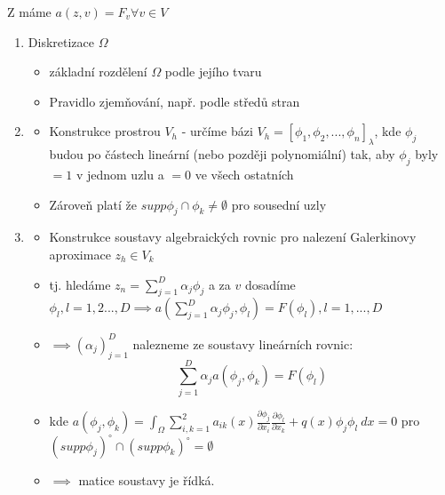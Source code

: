 \documentclass[../main.tex]{subfiles}
\begin{document}
Z  máme $a(z,v) = F_v \forall v \in V$ 


\begin{enumerate}
    \item Diskretizace $\Omega$ 
    \begin{itemize}
        \item základní rozdělení $\Omega$ podle jejího tvaru
        \item Pravidlo zjemňování, např. podle středů stran
    \end{itemize}

    \item\begin{itemize}
        \item Konstrukce prostrou $V_h$ - určíme bázi $V_h =  [\phi_1, \phi_2, ... , \phi_n ]_\lambda$, kde $\phi_j$ budou po částech lineární (nebo později polynomiální) tak, aby $\phi_j$ byly $=1$ v jednom uzlu a $=0$ ve všech ostatních
        \item Zároveň platí že $supp \phi_j \cap \phi_k \neq \emptyset$ pro sousední uzly
    \end{itemize}

    \item\begin{itemize}
        \item Konstrukce soustavy algebraických rovnic pro nalezení Galerkinovy aproximace $z_h \in V_k$
        \item tj. hledáme $z_n = \sum_{j=1}^D \alpha_j \phi_j$ a za $v$ dosadíme $\phi_l, l=1,2...,D \implies a(\sum_{j=1}^D \alpha_j \phi_j, \phi_l) = F(\phi_l), l = 1,...,D$
        \item $\implies (\alpha_j)^D_{j=1}$ nalezneme ze soustavy lineárních rovnic:
            \begin{equation}\label{soustavarovnic}
                \sum_{j=1}^D \alpha_j a(\phi_j, \phi_k) = F(\phi_l)
            \end{equation}
        \item kde $ a(\phi_j, \phi_k) = \int_\Omega \sum^2_{i,k=1} a_{ik}(x) \frac{\partial \phi_j}{\partial x_i} \frac{\partial\phi_l}{\partial x_k} + q(x) \phi_j \phi_l \ dx = 0$ \hfill\break pro $(supp \phi_j)^\circ \cap (supp \phi_k)^\circ = \emptyset$
        \item $\implies$ matice soustavy   je řídká. 
    \end{itemize}
\end{enumerate}
\end{document}
